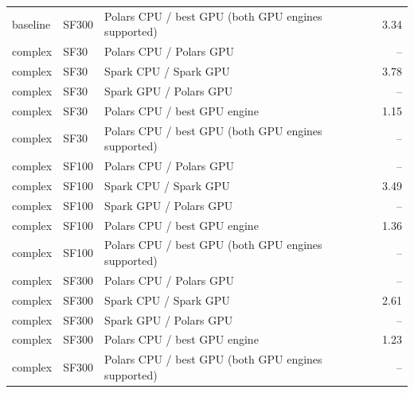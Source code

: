 \begin{tabular}{lllr}
baseline & SF300 & Polars CPU / best GPU (both GPU engines supported) & 3.34 \\
complex & SF30 & Polars CPU / Polars GPU & -- \\
complex & SF30 & Spark CPU / Spark GPU & 3.78 \\
complex & SF30 & Spark GPU / Polars GPU & -- \\
complex & SF30 & Polars CPU / best GPU engine & 1.15 \\
complex & SF30 & Polars CPU / best GPU (both GPU engines supported) & -- \\
complex & SF100 & Polars CPU / Polars GPU & -- \\
complex & SF100 & Spark CPU / Spark GPU & 3.49 \\
complex & SF100 & Spark GPU / Polars GPU & -- \\
complex & SF100 & Polars CPU / best GPU engine & 1.36 \\
complex & SF100 & Polars CPU / best GPU (both GPU engines supported) & -- \\
complex & SF300 & Polars CPU / Polars GPU & -- \\
complex & SF300 & Spark CPU / Spark GPU & 2.61 \\
complex & SF300 & Spark GPU / Polars GPU & -- \\
complex & SF300 & Polars CPU / best GPU engine & 1.23 \\
complex & SF300 & Polars CPU / best GPU (both GPU engines supported) & -- \\
\bottomrule
\end{tabular}
